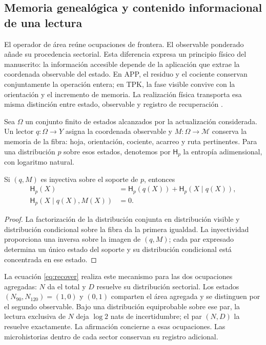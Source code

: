 \subsection{Memoria genealógica y contenido informacional de una lectura}
\label{sec:ii-memoria-lectura}

El operador de área reúne ocupaciones de frontera. El observable
ponderado añade su procedencia sectorial. Esta diferencia expresa un
principio físico del manuscrito: la información accesible depende de
la aplicación que extrae la coordenada observable del estado. En APP, el residuo y el cociente
conservan conjuntamente la operación entera; en TPK, la fase visible
convive con la orientación y el incremento de memoria. La realización
física transporta esa misma distinción entre estado, observable y
registro de recuperación \cite{informacion}.

Sea \(\Omega\) un conjunto finito de estados alcanzados por la
actualización considerada. Un lector \(q:\Omega\to Y\) asigna la
coordenada observable y \(M:\Omega\to\mathcal M\) conserva la memoria
de la fibra: hoja, orientación, cociente, acarreo y ruta pertinentes.
Para una distribución \(p\) sobre esos estados, denotemos por
\(\mathsf H_p\) la entropía adimensional, con logaritmo natural.

\begin{proposition}
Si \((q,M)\) es inyectiva sobre el soporte de \(p\), entonces
\begin{align}
 \mathsf H_p(X)&=\mathsf H_p(q(X))+
                 \mathsf H_p(X\mid q(X)),\\
 \mathsf H_p(X\mid q(X),M(X))&=0.
 \label{eq:ii-memoria-condicional}
\end{align}
\end{proposition}
\begin{proof}
La factorización de la distribución conjunta en distribución visible
y distribución condicional sobre la fibra da la primera igualdad.
La inyectividad proporciona una inversa sobre la imagen de \((q,M)\);
cada par expresado determina un único estado del soporte y su
distribución condicional está concentrada en ese estado.
\end{proof}

La ecuación \eqref{eq:recover} realiza este mecanismo para las dos
ocupaciones agregadas: \(N\) da el total y \(D\) resuelve su
distribución sectorial. Los estados \((N_{90},N_{120})=(1,0)\) y
\((0,1)\) comparten el área agregada y se distinguen por el segundo
observable. Bajo una distribución equiprobable sobre ese par, la
lectura exclusiva de \(N\) deja \(\log2\) nats de incertidumbre;
el par \((N,D)\) la resuelve exactamente. La afirmación concierne a
esas ocupaciones. Las microhistorias dentro de cada sector conservan
su registro adicional.

